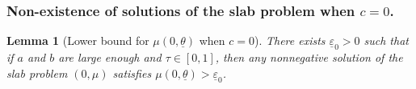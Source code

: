 \documentclass[11pt]{article}    %
\newtheorem{lemma}[theorem]{Lemma}
\renewcommand{\epsilon}{\varepsilon}
\begin{document}
\subsubsection*{Non-existence of solutions of the slab problem when $c=0$.}


\begin{lemma}[Lower bound for $\mu(0,\underline\theta)$ when $c=0$]\label{lem:bottom}
There exists $\underline\epsilon_0 > 0$ such that if $a$ and $b$ are large enough and $\tau\in[0,1]$, then any nonnegative solution of the slab problem $(0,\mu)$ satisfies $\mu(0,\underline\theta) > \underline\epsilon_0$. 
\end{lemma}
\end{document}
